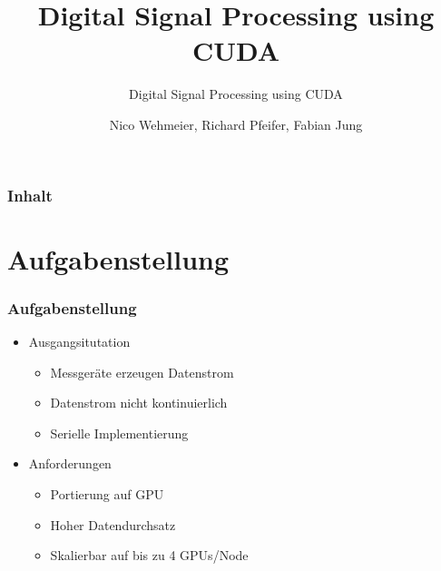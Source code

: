 \documentclass[ddcfooter]{tudbeamer}
\begin{document}
\title[Digital Signal Processing]{Digital Signal Processing using CUDA}
\subtitle{Digital Signal Processing using CUDA}
\author{Nico Wehmeier, Richard Pfeifer, Fabian Jung}

\maketitle

\begin{frame}
    \frametitle*{Inhalt}
    \tableofcontents[currentsection]
\end{frame}

\section{Aufgabenstellung}
\begin{frame}
\frametitle{Aufgabenstellung}
\begin{itemize} 
	\item{Ausgangsitutation}
	\begin{itemize}
		\item{Messgeräte erzeugen Datenstrom}
		\item{Datenstrom nicht kontinuierlich}
		\item{Serielle Implementierung}
	\end{itemize}
	\item{Anforderungen}
	\begin{itemize}
		\item{Portierung auf GPU}
		\item{Hoher Datendurchsatz}
		\item{Skalierbar auf bis zu 4 GPUs/Node}
	\end{itemize}
\end{itemize}
\end{frame}

\end{document}

